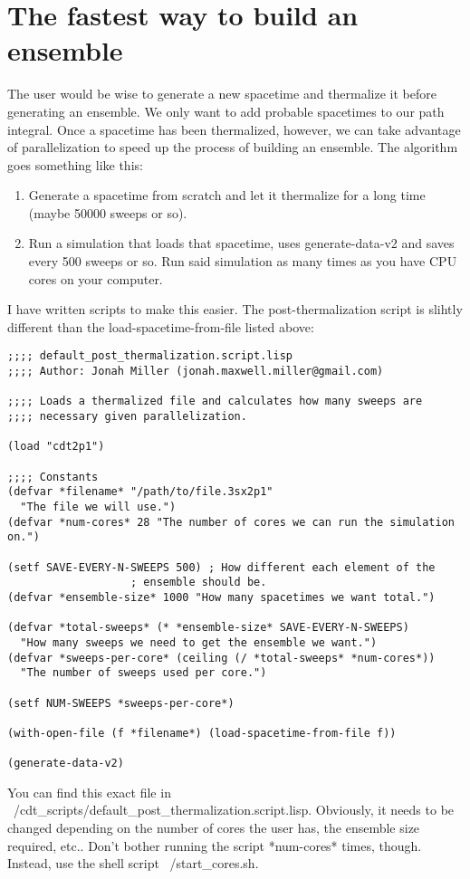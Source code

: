 \documentclass{article}
\begin{document}
\section{The fastest way to build an ensemble}
The user would be wise to generate a new spacetime and thermalize it
before generating an ensemble. We only want to add probable spacetimes
to our path integral. Once a spacetime has been thermalized, however,
we can take advantage of parallelization to speed up the process of
building an ensemble. The algorithm goes something like this:
\begin{enumerate}
\item Generate a spacetime from scratch and let it thermalize for a
  long time (maybe 50000 sweeps or so).
\item Run a simulation that loads that spacetime, uses
  generate-data-v2 and saves every 500 sweeps or so. Run said
  simulation as many times as you have CPU cores on your computer.
\end{enumerate}
I have written scripts to make this easier. The post-thermalization script is slihtly different than the load-spacetime-from-file listed above:
\begin{lstlisting}
;;;; default_post_thermalization.script.lisp
;;;; Author: Jonah Miller (jonah.maxwell.miller@gmail.com)

;;;; Loads a thermalized file and calculates how many sweeps are
;;;; necessary given parallelization.

(load "cdt2p1")

;;;; Constants
(defvar *filename* "/path/to/file.3sx2p1"
  "The file we will use.")
(defvar *num-cores* 28 "The number of cores we can run the simulation on.")

(setf SAVE-EVERY-N-SWEEPS 500) ; How different each element of the
			       ; ensemble should be.
(defvar *ensemble-size* 1000 "How many spacetimes we want total.")

(defvar *total-sweeps* (* *ensemble-size* SAVE-EVERY-N-SWEEPS) 
  "How many sweeps we need to get the ensemble we want.")
(defvar *sweeps-per-core* (ceiling (/ *total-sweeps* *num-cores*))
  "The number of sweeps used per core.")

(setf NUM-SWEEPS *sweeps-per-core*)

(with-open-file (f *filename*) (load-spacetime-from-file f))

(generate-data-v2)
\end{lstlisting}

You can find this exact file in
~/cdt\_scripts/default\_post\_thermalization.script.lisp. Obviously, it
needs to be changed depending on the number of cores the user has, the
ensemble size required, etc.. Don't bother running the script
*num-cores* times, though. Instead, use the shell script ~/start\_cores.sh.
\end{document}
